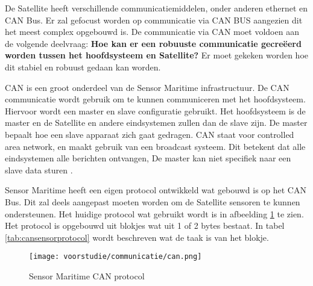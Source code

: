 De Satellite heeft verschillende communicatiemiddelen, onder anderen ethernet en CAN Bus. Er zal gefocust worden op communicatie via CAN BUS aangezien dit het meest complex opgebouwd is.  De communicatie via CAN moet voldoen aan de volgende deelvraag: \textbf{Hoe kan er een robuuste communicatie gecreëerd worden tussen het hoofdsysteem en Satellite?} Er moet gekeken worden hoe dit stabiel en robuust gedaan kan worden.\newline


\noindent CAN is een groot onderdeel van de Sensor Maritime infrastructuur. De CAN communicatie wordt gebruik om te kunnen communiceren met het hoofdsysteem. Hiervoor wordt een master en slave configuratie gebruikt. Het hoofdsysteem is de master en de Satellite en andere eindsystemen zullen dan de slave zijn. De master bepaalt hoe een slave apparaat zich gaat gedragen. CAN staat voor controlled area network, en maakt gebruik van een broadcast systeem. Dit betekent dat alle eindsystemen alle berichten ontvangen, De master kan niet specifiek naar een slave data sturen \autocite{can}. \newline

\noindent Sensor Maritime heeft een eigen protocol ontwikkeld wat gebouwd is op het CAN Bus. Dit zal deels aangepast moeten worden om de Satellite sensoren te kunnen ondersteunen. Het huidige protocol wat gebruikt wordt is in afbeelding \ref{fig:canprotocol} te zien. Het protocol is opgebouwd uit blokjes wat uit 1 of 2 bytes bestaat. In tabel \ref{tab:cansensorprotocol} wordt beschreven wat de taak is van het blokje.
\begin{figure}[h!]
	\label{fig:canprotocol}
	\caption{Sensor Maritime CAN protocol}
	\texttt{[image: voorstudie/communicatie/can.png]}
\end{figure}

